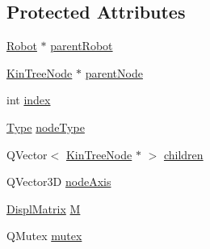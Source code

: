 \subsection*{Protected Attributes}
\begin{DoxyCompactItemize}
\item 
\hyperlink{class_robot_model_1_1_robot}{Robot} $\ast$ \hyperlink{class_robot_model_1_1_kin_tree_node_a135634b0e34e02ded1c61b29ef4d3c02}{parentRobot}
\item 
\hyperlink{class_robot_model_1_1_kin_tree_node}{KinTreeNode} $\ast$ \hyperlink{class_robot_model_1_1_kin_tree_node_ae708a7912fe1338f03ab9ebb2207a0e7}{parentNode}
\item 
int \hyperlink{class_robot_model_1_1_kin_tree_node_ab7be97fae982037992b0971ab25e643a}{index}
\item 
\hyperlink{class_robot_model_1_1_kin_tree_node_a6cc10fb82046bd1d9f61b806756ad176}{Type} \hyperlink{class_robot_model_1_1_kin_tree_node_acc89f79d42901042ca47a7b56761d4b1}{nodeType}
\item 
QVector$<$ \hyperlink{class_robot_model_1_1_kin_tree_node}{KinTreeNode} $\ast$ $>$ \hyperlink{class_robot_model_1_1_kin_tree_node_aa954f7e7939949e2e1a72ed9f7be3aaa}{children}
\item 
QVector3D \hyperlink{class_robot_model_1_1_kin_tree_node_af69707fb14705d4c1ab4ec6480e18b7e}{nodeAxis}
\item 
\hyperlink{class_robot_model_1_1_displ_matrix}{DisplMatrix} \hyperlink{class_robot_model_1_1_kin_tree_node_adc4909829a61513d89a23ebbf69d8243}{M}
\item 
QMutex \hyperlink{class_robot_model_1_1_kin_tree_node_ab2b663f51d01546b6e45be794a425438}{mutex}
\end{DoxyCompactItemize}


